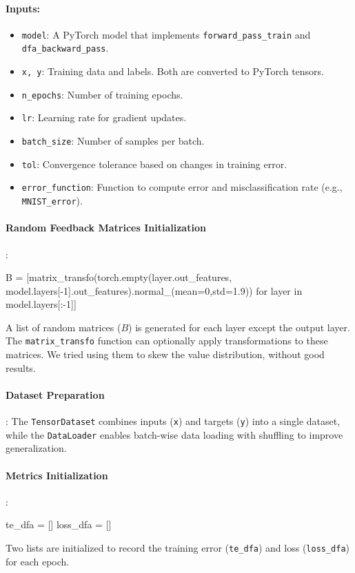 \documentclass[english]{article}
\begin{document}
\paragraph{Inputs:}
\begin{itemize}
    \item \texttt{model}: A PyTorch model that implements \texttt{forward\_pass\_train} and \texttt{dfa\_backward\_pass}.
    \item \texttt{x, y}: Training data and labels. Both are converted to PyTorch tensors.
    \item \texttt{n\_epochs}: Number of training epochs.
    \item \texttt{lr}: Learning rate for gradient updates.
    \item \texttt{batch\_size}: Number of samples per batch.
    \item \texttt{tol}: Convergence tolerance based on changes in training error.
    \item \texttt{error\_function}: Function to compute error and misclassification rate (e.g., \texttt{MNIST\_error}).
\end{itemize}

\paragraph{Random Feedback Matrices Initialization}:
\begin{python}
B = [matrix_transfo(torch.empty(layer.out_features, 
     model.layers[-1].out_features).normal_(mean=0,std=1.9)) for layer in model.layers[:-1]]
\end{python}
A list of random matrices (\(B\)) is generated for each layer except the output layer. The \texttt{matrix\_transfo} function can optionally apply transformations to these matrices. We tried using them to skew the value distribution, without good results.

\paragraph{Dataset Preparation}:
The \texttt{TensorDataset} combines inputs (\texttt{x}) and targets (\texttt{y}) into a single dataset, while the \texttt{DataLoader} enables batch-wise data loading with shuffling to improve generalization.

\paragraph{Metrics Initialization}:
\begin{python}
te_dfa = []
loss_dfa = []
\end{python}
Two lists are initialized to record the training error (\texttt{te\_dfa}) and loss (\texttt{loss\_dfa}) for each epoch.
\end{document}
